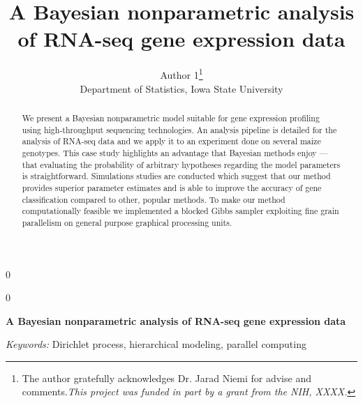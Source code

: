 \documentclass[12pt]{article}
\newcommand{\blind}{0}
\begin{document}
\newtoggle{thesis}
\toggletrue{thesis}
% 

\def\spacingset#1{\renewcommand{\baselinestretch}%
{#1}\small\normalsize} \spacingset{1}



\blind
{
  \title{\bf A Bayesian nonparametric analysis of RNA-seq gene expression data}
  \author{Author 1\thanks{
    The author gratefully acknowledges Dr. Jarad Niemi for advise and comments.\textit{This project was funded in part by a grant from the NIH, XXXX.}}\hspace{.2cm}\\
    Department of Statistics, Iowa State University}
  \maketitle
} \fi

\blind
{
  \bigskip
  \bigskip
  \bigskip
  \begin{center}
    {\LARGE\bf A Bayesian nonparametric analysis of RNA-seq gene expression data}
\end{center}
  \medskip
} \fi

\bigskip
\begin{abstract}
We present a Bayesian nonparametric model suitable for gene expression profiling using high-throughput sequencing technologies. An analysis pipeline is detailed for the analysis of RNA-seq data and we apply it to an experiment done on several maize genotypes. This case study highlights an advantage that Bayesian methods enjoy --- that evaluating the probability of arbitrary hypotheses regarding the model parameters is straightforward. Simulations studies are conducted which suggest that our method provides superior parameter estimates and is able to improve the accuracy of gene classification compared to other, popular methods. To make our method computationally feasible we implemented a blocked Gibbs sampler exploiting fine grain parallelism on general purpose graphical processing units.

\end{abstract}

\noindent%
{\it Keywords:}  Dirichlet process, hierarchical modeling, parallel computing
\vfill

\newpage
\tableofcontents

\spacingset{1.45} %


\end{document}
